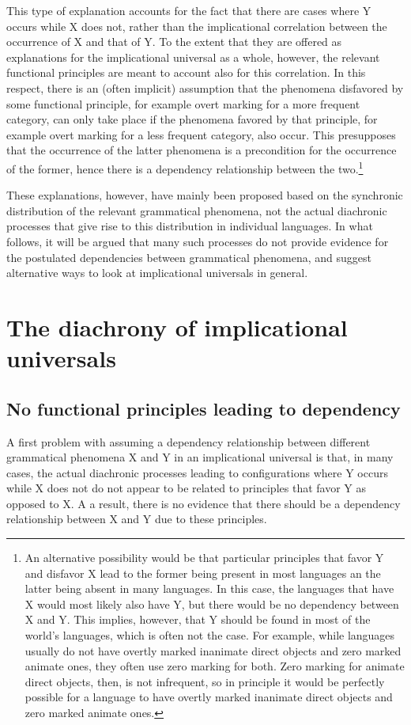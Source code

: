 \documentclass[output=paper]{langsci/langscibook}
\begin{document}
This type of explanation  accounts for
the fact that there are cases where Y occurs while X does not, rather
than the implicational correlation between the occurrence of X and that of Y.  To the extent
that they are offered as explanations for the implicational universal 
as a whole, however, the relevant functional principles  are  meant to
account  also for this correlation. In this respect, there is an (often
implicit) assumption that the phenomena disfavored by some
functional principle, for example overt marking for a more frequent category, can
only take place if the phenomena favored by that principle, for
example overt marking for a less frequent category, also occur. This presupposes that the occurrence of the latter phenomena is
a precondition for the occurrence of the former, hence there is a
dependency relationship between the two.\footnote{An alternative
  possibility would be that particular principles that favor Y and
  disfavor X lead to the former being present in most languages an the
  latter being absent in many languages. In this case, the
  languages that have X would most likely also have Y, but there would
  be no dependency between X and Y. This implies, however, that Y
should be found in most of the world's languages, which is often not the
case. For example, while languages
usually do not have overtly marked inanimate direct objects and zero marked
animate ones, they often use zero marking for both. Zero
marking for animate direct objects, then, is not infrequent, so in principle it would be
perfectly possible for a language to have overtly marked inanimate direct
objects and zero marked animate ones.}

These explanations, however, have mainly been proposed based on the
synchronic distribution of the relevant grammatical phenomena, not the actual diachronic  processes that give  rise to this
distribution in individual languages.  In what follows, it will be argued
that many such processes do not provide evidence for the postulated
dependencies between
grammatical phenomena, and suggest alternative ways to look at
implicational universals in general. 


\section{The diachrony of implicational universals}

\subsection{No  functional principles leading to dependency}
A first problem with assuming a dependency relationship between
different grammatical phenomena X and Y in an implicational universal 
is that, in many cases, the actual diachronic processes leading to
configurations where Y occurs while X does not do not appear to be related
to principles  that favor Y as opposed to X. A a result, there is no
evidence that there should be a dependency relationship between X and
Y due to these principles.
\end{document}
